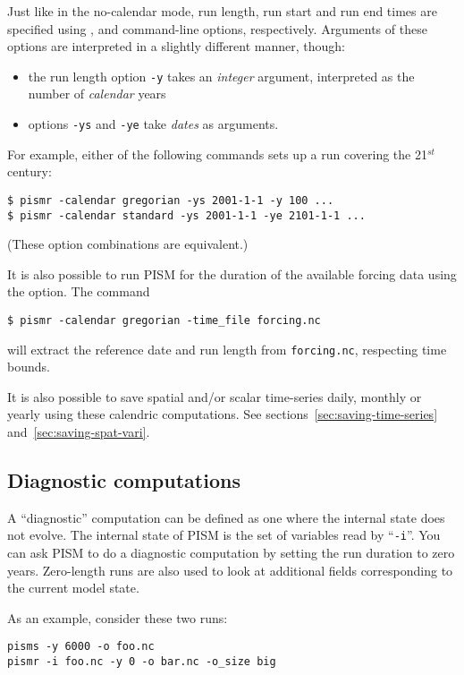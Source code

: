 Just like in the no-calendar mode, run length, run start and run end
times are specified using ,  and
 command-line options, respectively. Arguments of
these options are interpreted in a slightly different manner, though:
\begin{itemize}
\item the run length option \texttt{-y} takes an \emph{integer}
  argument, interpreted as the number of \emph{calendar} years
\item options \texttt{-ys} and \texttt{-ye} take \emph{dates} as arguments.
\end{itemize}

For example, either of the following commands sets up a run covering the 21$^{st}$ century:
\begin{verbatim}
$ pismr -calendar gregorian -ys 2001-1-1 -y 100 ...
$ pismr -calendar standard -ys 2001-1-1 -ye 2101-1-1 ...
\end{verbatim}
(These option combinations are equivalent.)

It is also possible to run PISM for the duration of the available forcing data using the  option.  The command
\begin{verbatim}
$ pismr -calendar gregorian -time_file forcing.nc
\end{verbatim}
will extract the reference date and run length from \texttt{forcing.nc}, respecting time bounds.

It is also possible to save spatial and/or scalar time-series daily, monthly or yearly using these calendric computations. See sections~\ref{sec:saving-time-series} and~\ref{sec:saving-spat-vari}.


\subsection{Diagnostic computations}
\label{sec:diagnostic-computations}

A ``diagnostic'' computation can be defined as one where the internal state does not evolve.  The internal state of PISM is the set of variables read by ``\texttt{-i}''.  You can ask PISM to do a diagnostic computation by setting the run duration to zero years.  Zero-length runs are also used to look at additional fields corresponding to the current model state.

As an example, consider these two runs:
\begin{verbatim}
pisms -y 6000 -o foo.nc
pismr -i foo.nc -y 0 -o bar.nc -o_size big
\end{verbatim}

